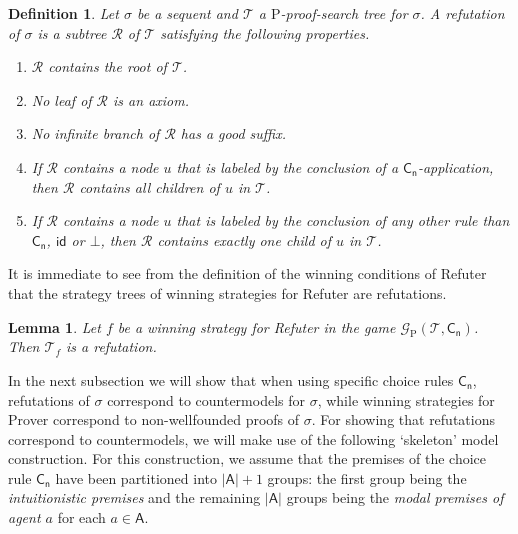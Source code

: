 \documentclass{myifcolog}
\newcommand\A{\mathsf{A}}
\newcommand{\agi}{a}
\newcommand{\hickp}{\mathrm{P}}
\newtheorem{definition}[theorem]{Definition}
\newtheorem{lemma}[theorem]{Lemma}
\numberwithin{theorem}{section}
\begin{document}

\begin{definition}\label{def refutation}
    Let $\sigma$ be a sequent and $\mathcal{T}$ a $\hickp$-proof-search tree for $\sigma$. A \emph{refutation} of $\sigma$ is a subtree $\mathscr{R}$ of $\mathcal{T}$ satisfying the following properties.
    \begin{enumerate}
        \item $\mathscr{R}$ contains the root of $\mathcal{T}$.
        \item No leaf of $\mathscr{R}$ is an axiom. 
        \item No infinite branch of $\mathscr{R}$ has a good suffix.
        \item If $\mathscr{R}$ contains a node $u$ that is labeled by the conclusion of a $\mathsf{C_n}$-application, then $\mathscr{R}$ contains all children of $u$ in $\mathcal{T}$.
        \item If $\mathscr{R}$ contains a node $u$ that is labeled by the conclusion of any other rule than $\mathsf{C_n}$, $\mathsf{id}$ or $\bot$, then $\mathscr{R}$ contains exactly one child of $u$ in $\mathcal{T}$.
    \end{enumerate}
\end{definition}

It is immediate to see from the definition of the winning conditions of Refuter that the strategy trees of winning strategies for Refuter are refutations.

\begin{lemma}\label{l: winning strategy for refuter is refutation IM}
    Let $f$ be a winning strategy for Refuter in the game $\mathcal{G}_\hickp(\mathcal{T}, \mathsf{C_n})$. Then $\mathcal{T}_f$ is a refutation.
\end{lemma}

In the next subsection we will show that when using specific choice rules $\mathsf{C_n}$, refutations of $\sigma$ correspond to countermodels for $\sigma$, while winning strategies for Prover correspond to non-wellfounded proofs of $\sigma$. For showing that refutations correspond to countermodels, we will make use of the following `skeleton' model construction. For this construction, we assume that the premises of the choice rule $\mathsf{C_n}$ have been partitioned into $\lvert \A \rvert + 1$ groups: the first group being the \emph{intuitionistic premises} and the remaining $\lvert \A \rvert$ groups being the \emph{modal premises of agent $\agi$} for each $\agi \in \A$.
\end{document}
